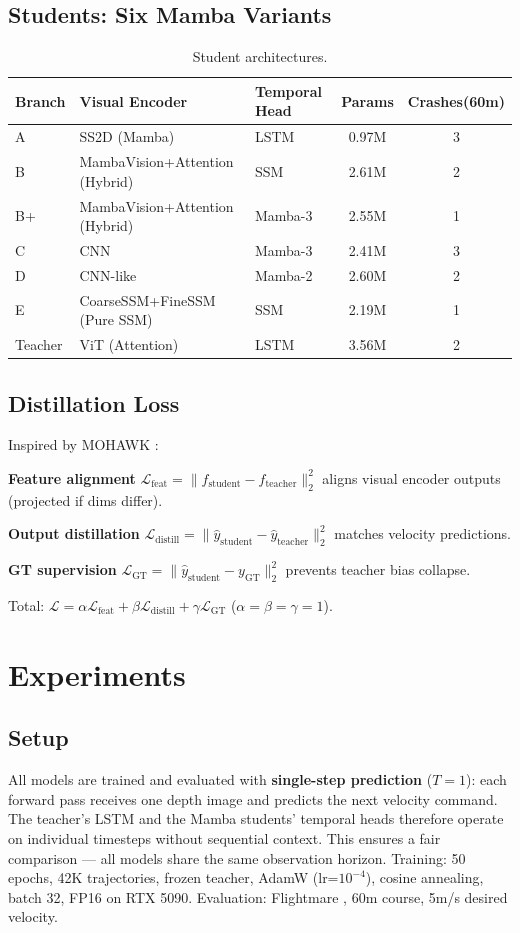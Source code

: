 \documentclass{article}
\begin{document}
\subsection{Students: Six Mamba Variants}
\begin{table}[t]
\centering
\caption{Student architectures.}
\label{tab:archs}
\begin{tabular}{lllcc}
\toprule
Branch & Visual Encoder & Temporal Head & Params & Crashes(60m) \\
\midrule
A & SS2D (Mamba) & LSTM & 0.97M & 3 \\
B & MambaVision+Attention (Hybrid) & SSM & 2.61M & 2 \\
B+ & MambaVision+Attention (Hybrid) & Mamba-3 & 2.55M & 1 \\
C & CNN & Mamba-3 & 2.41M & 3 \\
D & CNN-like & Mamba-2 & 2.60M & 2 \\
E & CoarseSSM+FineSSM (Pure SSM) & SSM & 2.19M & 1 \\
\midrule
Teacher & ViT (Attention) & LSTM & 3.56M & 2 \\
\bottomrule
\end{tabular}
\end{table}

\subsection{Distillation Loss}
Inspired by MOHAWK \cite{bick2024mohawk}:

\textbf{Feature alignment} $\mathcal{L}_{\text{feat}} = \|f_{\text{student}} - f_{\text{teacher}}\|_2^2$ aligns visual encoder outputs (projected if dims differ).

\textbf{Output distillation} $\mathcal{L}_{\text{distill}} = \|\hat{y}_{\text{student}} - \hat{y}_{\text{teacher}}\|_2^2$ matches velocity predictions.

\textbf{GT supervision} $\mathcal{L}_{\text{GT}} = \|\hat{y}_{\text{student}} - y_{\text{GT}}\|_2^2$ prevents teacher bias collapse.

Total: $\mathcal{L} = \alpha\mathcal{L}_{\text{feat}} + \beta\mathcal{L}_{\text{distill}} + \gamma\mathcal{L}_{\text{GT}}$ ($\alpha=\beta=\gamma=1$).

\section{Experiments}

\subsection{Setup}
All models are trained and evaluated with \textbf{single-step prediction} ($T=1$): each forward pass receives one depth image and predicts the next velocity command. The teacher's LSTM and the Mamba students' temporal heads therefore operate on individual timesteps without sequential context. This ensures a fair comparison --- all models share the same observation horizon. Training: 50 epochs, 42K trajectories, frozen teacher, AdamW (lr=$10^{-4}$), cosine annealing, batch 32, FP16 on RTX 5090. Evaluation: Flightmare \cite{shah2017flightmare}, 60m course, 5m/s desired velocity.
\end{document}
